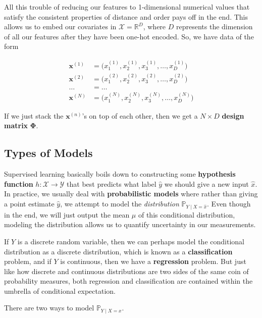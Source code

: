 \documentclass{article}
\theoremstyle{definition}
\begin{document}
  All this trouble of reducing our features to 1-dimensional numerical values that satisfy the consistent properties of distance and order pays off in the end. This allows us to embed our covariates in $\mathcal{X} = \mathbb{R}^D$, where $D$ represents the dimension of all our features after they have been one-hot encoded. So, we have data of the form

  \begin{align*} 
    \mathbf{x}^{(1)} & = \big(x^{(1)}_1, x^{(1)}_2, x^{(1)}_3, \ldots, x^{(1)}_D \big) \\
    \mathbf{x}^{(2)} & = \big(x^{(2)}_1, x^{(2)}_2, x^{(2)}_3, \ldots, x^{(2)}_D \big) \\
    \ldots & = \ldots \\
    \mathbf{x}^{(N)} & = \big(x^{(N)}_1, x^{(N)}_2, x^{(N)}_3, \ldots, x^{(N)}_D \big) 
  \end{align*}

  If we just stack the $\mathbf{x}^{(n)}$'s on top of each other, then we get a $N \times D$ \textbf{design matrix} $\boldsymbol{\Phi}$. 

  \subsection{Types of Models}

    Supervised learning basically boils down to constructing some \textbf{hypothesis function} $h: \mathcal{X} \rightarrow \mathcal{Y}$ that best predicts what label $\hat{y}$ we should give a new input $\hat{x}$. In practice, we usually deal with \textbf{probabilistic models} where rather than giving a point estimate $\hat{y}$, we attempt to model the \textit{distribution} $\mathbb{P}_{Y \mid X = \hat{x}}$. Even though in the end, we will just output the mean $\mu$ of this conditional distribution, modeling the distribution allows us to quantify uncertainty in our measurements. 

    If $Y$ is a discrete random variable, then we can perhaps model the conditional distribution as a discrete distribution, which is known as a \textbf{classification} problem, and if $Y$ is continuous, then we have a \textbf{regression} problem. But just like how discrete and continuous distributions are two sides of the same coin of probability measures, both regression and classification are contained within the umbrella of conditional expectation. 

    There are two ways to model $\mathbb{P}_{Y \mid X = x}$. 
\end{document}
